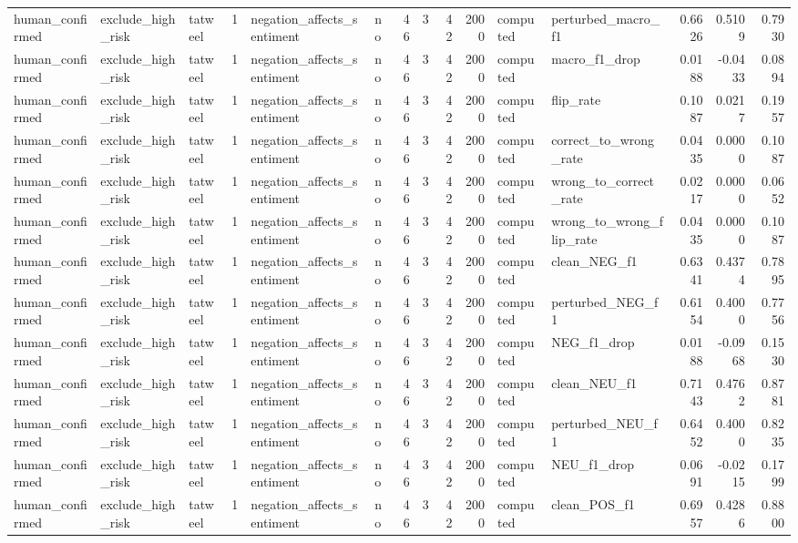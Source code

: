 \begin{tabular}{lllrllrrrrllrrr}
human_confirmed & exclude_high_risk & tatweel & 1 & negation_affects_sentiment & no & 46 & 3 & 42 & 2000 & computed & perturbed_macro_f1 & 0.6626 & 0.5109 & 0.7930 \\
human_confirmed & exclude_high_risk & tatweel & 1 & negation_affects_sentiment & no & 46 & 3 & 42 & 2000 & computed & macro_f1_drop & 0.0188 & -0.0433 & 0.0894 \\
human_confirmed & exclude_high_risk & tatweel & 1 & negation_affects_sentiment & no & 46 & 3 & 42 & 2000 & computed & flip_rate & 0.1087 & 0.0217 & 0.1957 \\
human_confirmed & exclude_high_risk & tatweel & 1 & negation_affects_sentiment & no & 46 & 3 & 42 & 2000 & computed & correct_to_wrong_rate & 0.0435 & 0.0000 & 0.1087 \\
human_confirmed & exclude_high_risk & tatweel & 1 & negation_affects_sentiment & no & 46 & 3 & 42 & 2000 & computed & wrong_to_correct_rate & 0.0217 & 0.0000 & 0.0652 \\
human_confirmed & exclude_high_risk & tatweel & 1 & negation_affects_sentiment & no & 46 & 3 & 42 & 2000 & computed & wrong_to_wrong_flip_rate & 0.0435 & 0.0000 & 0.1087 \\
human_confirmed & exclude_high_risk & tatweel & 1 & negation_affects_sentiment & no & 46 & 3 & 42 & 2000 & computed & clean_NEG_f1 & 0.6341 & 0.4374 & 0.7895 \\
human_confirmed & exclude_high_risk & tatweel & 1 & negation_affects_sentiment & no & 46 & 3 & 42 & 2000 & computed & perturbed_NEG_f1 & 0.6154 & 0.4000 & 0.7756 \\
human_confirmed & exclude_high_risk & tatweel & 1 & negation_affects_sentiment & no & 46 & 3 & 42 & 2000 & computed & NEG_f1_drop & 0.0188 & -0.0968 & 0.1530 \\
human_confirmed & exclude_high_risk & tatweel & 1 & negation_affects_sentiment & no & 46 & 3 & 42 & 2000 & computed & clean_NEU_f1 & 0.7143 & 0.4762 & 0.8781 \\
human_confirmed & exclude_high_risk & tatweel & 1 & negation_affects_sentiment & no & 46 & 3 & 42 & 2000 & computed & perturbed_NEU_f1 & 0.6452 & 0.4000 & 0.8235 \\
human_confirmed & exclude_high_risk & tatweel & 1 & negation_affects_sentiment & no & 46 & 3 & 42 & 2000 & computed & NEU_f1_drop & 0.0691 & -0.0215 & 0.1799 \\
human_confirmed & exclude_high_risk & tatweel & 1 & negation_affects_sentiment & no & 46 & 3 & 42 & 2000 & computed & clean_POS_f1 & 0.6957 & 0.4286 & 0.8800 \\

\end{tabular}
